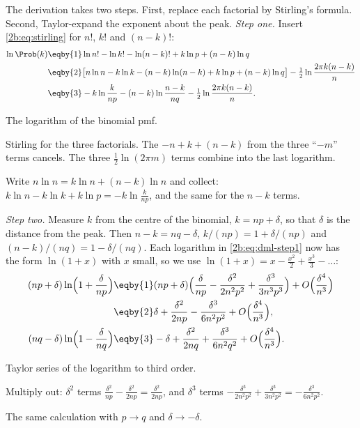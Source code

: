 The derivation takes two steps. First, replace each factorial by Stirling's formula. Second, Taylor-expand the exponent about the peak. \emph{Step one.} Insert \eqref{2b:eq:stirling} for $n!$, $k!$ and $(n-k)!$:
\begin{align}
  \ln\Prob(k)
  &\eqby{1} \ln n!-\ln k!-\ln(n-k)!+k\ln p+(n-k)\ln q \nonumber\\
  &\eqby{2} \bigl[n\ln n-k\ln k-(n-k)\ln(n-k)+k\ln p+(n-k)\ln q\bigr]
     -\tfrac12\ln\frac{2\pi k(n-k)}{n} \nonumber\\
  &\eqby{3} -k\ln\frac{k}{np}-(n-k)\ln\frac{n-k}{nq}-\tfrac12\ln\frac{2\pi k(n-k)}{n} .
  \label{2b:eq:dml-step1}
\end{align}
\begin{explain}
  \item The logarithm of the binomial pmf.
  \item Stirling for the three factorials. The $-n+k+(n-k)$ from the three ``$-m$'' terms cancels. The three $\tfrac12\ln(2\pi m)$ terms combine into the last logarithm.
  \item Write $n\ln n=k\ln n+(n-k)\ln n$ and collect: $k\ln n-k\ln k+k\ln p=-k\ln\frac{k}{np}$, and the same for the $n-k$ terms.
\end{explain}
\emph{Step two.} Measure $k$ from the centre of the binomial, $k=np+\delta$, so that $\delta$ is the distance from the peak. Then $n-k=nq-\delta$, $k/(np)=1+\delta/(np)$ and $(n-k)/(nq)=1-\delta/(nq)$. Each logarithm in \eqref{2b:eq:dml-step1} now has the form $\ln(1+x)$ with $x$ small, so we use $\ln(1+x)=x-\tfrac{x^2}{2}+\tfrac{x^3}{3}-\dots$:
\begin{align}
  (np+\delta)\ln\Bigl(1+\frac{\delta}{np}\Bigr)
  &\eqby{1} (np+\delta)\Bigl(\frac{\delta}{np}-\frac{\delta^2}{2n^2p^2}+\frac{\delta^3}{3n^3p^3}\Bigr)+O\Bigl(\frac{\delta^4}{n^3}\Bigr) \nonumber\\
  &\eqby{2} \delta+\frac{\delta^2}{2np}-\frac{\delta^3}{6n^2p^2}+O\Bigl(\frac{\delta^4}{n^3}\Bigr),\nonumber\\
  (nq-\delta)\ln\Bigl(1-\frac{\delta}{nq}\Bigr)
  &\eqby{3} -\delta+\frac{\delta^2}{2nq}+\frac{\delta^3}{6n^2q^2}+O\Bigl(\frac{\delta^4}{n^3}\Bigr) .
  \label{2b:eq:dml-taylor}
\end{align}
\begin{explain}
  \item Taylor series of the logarithm to third order.
  \item Multiply out: $\delta^2$ terms $\frac{\delta^2}{np}-\frac{\delta^2}{2np}=\frac{\delta^2}{2np}$, and $\delta^3$ terms $-\frac{\delta^3}{2n^2p^2}+\frac{\delta^3}{3n^2p^2}=-\frac{\delta^3}{6n^2p^2}$.
  \item The same calculation with $p\to q$ and $\delta\to-\delta$.
\end{explain}
